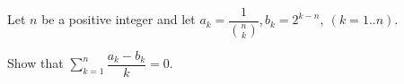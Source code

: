 Let \(n\) be a positive integer and let \(a_k = \dfrac{1}{\binom{n}{k}}, b_k = 2^{k-n},\ (k=1..n)\).

Show that \(\sum_{k=1}^n \dfrac{a_k-b_k}{k} = 0\).